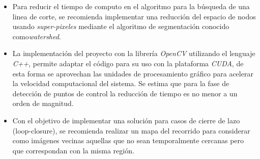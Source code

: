 \begin{itemize}
	\item Para reducir el tiempo de computo en el algoritmo para la búsqueda de una linea de corte, se recomienda implementar una reducción del espacio de nodos usando \textit{super-pixeles} mediante el algoritmo de segmentación conocido como\textit{watershed}.
	
	\item La implementación del proyecto con la librería \textit{OpenCV} utilizando el lenguaje \textit{C++}, permite adaptar el código para su uso con la plataforma \textit{CUDA}, de esta forma se aprovechan las unidades de procesamiento gráfico para acelerar la velocidad computacional del sistema. Se estima que para la fase de detección de puntos de control la reducción de tiempo es no menor a un orden de magnitud.
	
	\item Con el objetivo de implementar una solución para casos de cierre de lazo (loop-closure), se recomienda realizar un mapa del recorrido para considerar como imágenes vecinas aquellas que no sean temporalmente cercanas pero que correspondan con la misma región.
\end{itemize}

